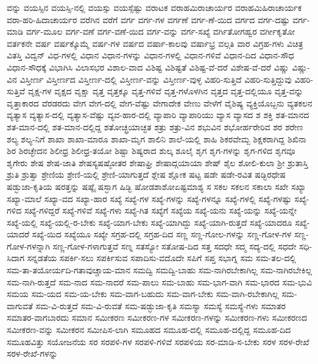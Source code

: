 {ವನ್ನು
ವಯಸ್ಸಿನ
ವಯಸ್ಸಿ-ನಲ್ಲಿ
ವಯಸ್ಸು
ವಯಸ್ಸೆಷ್ಟು
ವರಾಟಕ
ವರಾಹಮಿರಾಚಾರ್ಯರ
ವರಾಹಮಿಹಿರಾಚಾರ್ಯಕ
ವರಾ-ಹರಿ-ಹಿದಾಚಾರ್ಯರ
ವರೆಗಿನ
ವರೆಗೆ
ವರ್ಗ
ವರ್ಗ-ಗಳ
ವರ್ಗಣೆ
ವರ್ಗ-ಣೆ-ಯಿದ
ವರ್ಗದ
ವರ್ಗ-ದಷ್ಟು
ವರ್ಗ-ಮಾಡಿ
ವರ್ಗ-ಮೂಲ
ವರ್ಗ-ವಣೆ
ವರ್ಗ-ವಣೆ-ಯಿದ
ವರ್ಗ-ವನ್ನು
ವರ್ಗ-ಸಖ್ಯೆ
ವರ್ಗಿತೋಗಹ್ವರ
ವರ್ಗೀಕೃತೋ
ವರ್ತಕನೇ
ವರ್ಷ
ವರ್ಷಕ್ಕೊಮ್ಮೆ
ವರ್ಷ-ಗಳ
ವರ್ಷದ
ವರ್ಷಾ-ಕಾಲವು
ವರ್ಷಾಭ್ರ
ವಲ್ಗತಿ
ವಾರ
ವಿಗ್ರಹ-ಗಳು
ವಿಚಿತ್ರ
ವಿತಸ್ತಿ
ವಿದ್ವನ್
ವಿಧ-ಗಳಲ್ಲಿ
ವಿಧಾನ
ವಿಧಾನ-ಗಳನ್ನು
ವಿಧಾನ-ಗಳಲ್ಲಿ
ವಿಧಾನ-ಗಳಿವೆ
ವಿಧಾನ-ದಿದ
ವಿಧಾನ-ಸೌಧ
ವಿಧಾನ-ಸೌಧಕ್ಕೆ
ವಿಭಾಗಿಸಿ
ವಿಲಾಸಭರ
ವಿಶಾಲ-ವಾದ
ವಿಶಿಷ್ಟ
ವಿಶಿಷ್ಟತೆ
ವಿಶಿಷ್ಟ-ವೆ-ದರೆ
ವಿಶೇಷ-ವೆ-ದರೆ
ವಿಷ್ಣು
ವಿಷ್ಣು-ವಿನ
ವಿಸ್ತೀರ್ಣ
ವಿಸ್ತೀರ್ಣದ
ವಿಸ್ತೀರ್ಣ-ದಲ್ಲಿ
ವಿಸ್ತೀರ್ಣ-ವನ್ನು
ವಿಸ್ತೀರ್ಣ-ವುಳ್ಳ
ವಿಹರಿ-ಸುತ್ತಿದೆ
ವಿಹರಿ-ಸುತ್ತಿದ್ದುವು
ವಿಹರಿ-ಸುತ್ತಿವೆ
ವೃಕ್ಷ-ಗಳ
ವೃಕ್ಷದ
ವೃಕ್ಷಾ
ವೃತ್ತ
ವೃತ್ತಕ್ಕೂ
ವೃತ್ತ-ಗಳಿವೆ
ವೃತ್ತ-ಗಳೊಳಗಿನ
ವೃತ್ತದ
ವೃತ್ತ-ದಲ್ಲಿಯೂ
ವೃತ್ತ-ವನ್ನು
ವೃತ್ತಾಕಾರದ
ವೆರಡರದು
ವೇಗ
ವೇಗ-ದಲ್ಲಿ
ವೇಗ-ವೆಷ್ಟು
ವೇಗಾದೇಕ
ವೇಣು
ವೇಳೆಗೆ
ವೈಶಿಷ್ಯ
ವ್ಯಕ್ತಿಯೊಬ್ಬನು
ವ್ಯತಕಲನ
ವ್ಯತ್ಯಾಸ
ವ್ಯತ್ಯಾಸ-ದಲ್ಲಿ
ವ್ಯತ್ಯಾಸ-ವೆಷ್ಟು
ವ್ಯವ-ಹಾರ-ದಲ್ಲಿ
ವ್ಯಾಪಾರಿ
ವ್ಯಾಪಾರಿಯು
ವ್ಯಾಸ
ವ್ಯಾಸದ
ಶ
ಶಕ್ತಿ
ಶತ-ಮಾನದ
ಶತ-ಮಾನ-ದಲ್ಲಿ
ಶತ-ಮಾನ-ದಲ್ಲಿದ್ದ
ಶತೋಚ್ಛ್ರಯಾಚ್ಛತ
ಶತ್ರು
ಶತ್ರು-ವಿನ
ಶಭುವಿನ
ಶಭೋರ್ಹರೇರಿವ
ಶರ
ಶರೇಣ
ಶಲ್ಯ
ಶಲ್ಯ-ನಿಗೆ
ಶಾಖಾ
ಶಾಖಾ-ಮಾರೂ
ಶಾಖಾ-ಮೃಗ
ಶಾಲಿನಿ
ಶಾಲೆ-ಯಲ್ಲಿ
ಶಾಹಿ
ಶಿಕರವೇಮ್ಬ
ಶಿಕ್ಷಕರಾಗಿದ್ದ
ಶಿಖಿನಾ
ಶಿರ
ಶಿರಚ್ಛೇದನ
ಶಿಲೀಧ್ರ
ಶಿಲೀಧ್ರ-ತಯೋ
ಶಿಷ್ಟಾ
ಶಿಷ್ಯರಾದ
ಶುಲ್ಕ
ಶೂಲೈ
ಶೃಗ
ಶೃಗ-ಗಳನ್ನು
ಶೃಗ-ಗಳಿದ
ಶೃಗವೂ
ಶೃಗೇರು
ಶೇಷ
ಶೇಷ-ಜಾತಿ
ಶೇಷಸ್ಯಷಷ್ಠೋತರ
ಶೇಷಾಘ್ರಿ
ಶೇಷಾದ್ಗಯಾಯಾ
ಶೇಷ್
ಶೈಲ
ಶೋಲಿ-ಕುಲಾ
ಶ್ರೀ
ಶ್ರುತಾಸ್ತಿ
ಶ್ರುತಿ
ಶ್ರುತ್ವಾ
ಶ್ರೇಣಿಯ
ಶ್ರೇಣಿ-ಯಲ್ಲಿ
ಶ್ರೇಣಿ-ಯಾಗುತ್ತದೆ
ಶ್ಲೇಷ
ಶ್ಲೋಕ
ಷಟ್ಟ
ಷಡೇ
ಷಡೇ-ರವಿತ
ಷಡ್ಭಿರಧೇಷ
ಷಡ್ಭುಜಾ-ಕೃತಿಯ
ಷರತ್ತನ್ನು
ಷಷ್ಠೈ
ಷಸ್ಭಾಗ
ಷಿಡ್ಭಿ
ಷೋಡಶಾಶೋಏಷ್ಟಮಾಶ್ಯ
ಸ
ಸಕಲ
ಸಕಲನ
ಸಕಾಲಾ
ಸಖೇ
ಸಖ್ಯಾ
ಸಖ್ಯಾ-ಮಾಲೆ
ಸಖ್ಯಾ-ವದ
ಸಖ್ಯಾ-ಹಾರ
ಸಖ್ಯೆ
ಸಖ್ಯೆ-ಗಳ
ಸಖ್ಯೆ-ಗಳನ್ನು
ಸಖ್ಯೆ-ಗಳನ್ನೂ
ಸಖ್ಯೆ-ಗಳಲ್ಲಿ
ಸಖ್ಯೆ-ಗಳಷ್ಟು
ಸಖ್ಯೆ-ಗಳಿದ
ಸಖ್ಯೆ-ಗಳಿದ್ದರೆ
ಸಖ್ಯೆ-ಗಳಿವೆ
ಸಖ್ಯೆ-ಗಳು
ಸಖ್ಯೆ-ಗಿತ
ಸಖ್ಯೆಗೆ
ಸಖ್ಯೆಯ
ಸಖ್ಯೆ-ಯನು
ಸಖ್ಯೆ-ಯನ್ನು
ಸಖ್ಯೆ-ಯನ್ನೇ
ಸಖ್ಯೆ-ಯಲ್ಲಿ
ಸಖ್ಯೆ-ಯಲ್ಲಿ-ರ-ಬೇಕು
ಸಖ್ಯೆ-ಯಾಗ-ಬೇಕು
ಸಖ್ಯೆ-ಯಾಗಿದ್ದು
ಸಖ್ಯೆ-ಯಾಗಿ-ರುತ್ತದೆ
ಸಖ್ಯೆ-ಯಾದರೂ
ಸಖ್ಯೆ-ಯಾದರೆ
ಸಖ್ಯೆ-ಯಿದ
ಸಖ್ಯೆಯೂ
ಸಖ್ಯೇ
ಸಗ್ರಹ-ದಲ್ಲಿ
ಸಗ್ರಹ-ದಿದ
ಸಣ್ಣ
ಸಣ್ಣ-ಗೋಲ-ಗಳನ್ನು
ಸಣ್ಣ-ಗೋಳ-ಗಳ
ಸಣ್ಣ-ಗೋಳ-ಗಳನ್ನಾಗಿ
ಸಣ್ಣ-ಗೋಳ-ಗಳಾಗುತ್ತವೆ
ಸಣ್ನ
ಸತಸ್ಯೋ
ಸತೋಷ-ದಿದ
ಸತ್ತ
ಸದಧೇ
ಸದ್ಮ
ಸದ್ಯ-ದಲ್ಲಿ
ಸಧದೇ
ಸಧಿ-ಸಿದಾಗ
ಸನ್ನಡತೆಯ
ಸಪರ್ಕಿ-ಸಲು
ಸಪರ್ಕಿಸುವ
ಸಪಾದಿಸು-ವದೊದೇ
ಸಪಿಗೆ
ಸಪ್ತ
ಸಭಾಗ್ನ
ಸಮ
ಸಮ-ತಲ-ದಲ್ಲಿ
ಸಮ-ತಾ-ತಯೋರ್ಯದಿ-ಗತಾವುಚ್ಚಾಯ-ಮಾನ
ಸಮದ್ವಿ
ಸಮದ್ವಿ-ಬಾಹು
ಸಮ-ನಾಗಿರಬೇಕಾಗಿಲ್ಲ
ಸಮ-ನಾಗಿರಬೇಕಿಲ್ಲ
ಸಮ-ನಾಗಿ-ರುತ್ತದೆ
ಸಮ-ನಾದ
ಸಮ-ನಾದರೆ
ಸಮ-ಪಾಲು
ಸಮ-ಬಾಹು
ಸಮ-ಭಾಗ-ವಾಗಿ
ಸಮ-ಭಾರದ
ಸಮ-ಭುವಿ
ಸಮಯ
ಸಮ-ಯದ
ಸಮ-ಯ-ಬೇಕು
ಸಮ-ವಾಗ-ಬಹುದು
ಸಮ-ವಾಗ-ಬೇಕು
ಸಮ-ವಾಗಿ-ರಬೇಕಾಗಿಲ್ಲ
ಸಮ-ವಾಗುವತೆ
ಸಮ-ವಿ-ರುತ್ತದೆ
ಸಮ-ವಿ-ರುವತೆ
ಸಮ-ಷಡ್ಭುಜಾ-ಕೃತಿ
ಸಮಸ್ಯಾ
ಸಮಸ್ಯೆ
ಸಮಸ್ಯೆ-ಗಳು
ಸಮಾತರ
ಸಮಾತರ-ವಾಗಬಾರದು
ಸಮಾನ
ಸಮೀಕರಣ
ಸಮೀಕರಣ-ಗಳ
ಸಮೀಕರಣ-ಗಳನ್ನು
ಸಮೀಕರಣ-ಗಳು
ಸಮೀಕರಣದ
ಸಮೀಕರಣ-ವನ್ನು
ಸಮೀಕರನ
ಸಮೀಪಿಸ-ಲಾಗಿ
ಸಮೂಹದ
ಸಮೂಹ-ದಲ್ಲಿ
ಸಮೂಹ-ದಲ್ಲಿದ್ದ
ಸಮೂಹ-ದಿದ
ಸಮೂಹವಿತ್ತು
ಸಯೋಜನೆಯ
ಸರ
ಸರಪಳಿ-ಗಳ
ಸರಪಳಿ-ಗಳಿವೆ
ಸರಪಳಿಯ
ಸರ-ಮಾಡಿ-ಸ-ಬೇಕು
ಸರಳ
ಸರಳ-ರೇಖೆ
ಸರಳ-ರೇಖೆ-ಗಳನ್ನು
}
